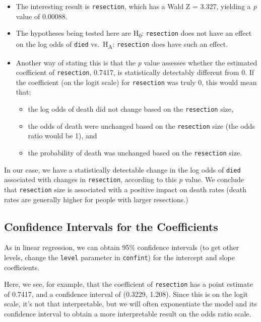 \documentclass[]{book}
\providecommand{\tightlist}{%
  \setlength{\itemsep}{0pt}\setlength{\parskip}{0pt}}
\theoremstyle{definition}
\theoremstyle{definition}
\theoremstyle{definition}
\theoremstyle{remark}
\begin{document}
\begin{itemize}
\tightlist
\item
  The interesting result is \texttt{resection}, which has a Wald Z =
  3.327, yielding a \emph{p} value of 0.00088.
\item
  The hypotheses being tested here are H\textsubscript{0}:
  \texttt{resection} does not have an effect on the log odds of
  \texttt{died} vs.~H\textsubscript{A}: \texttt{resection} does have
  such an effect.
\item
  Another way of stating this is that the \emph{p} value assesses
  whether the estimated coefficient of \texttt{resection}, 0.7417, is
  statistically detectably different from 0. If the coefficient (on the
  logit scale) for \texttt{resection} was truly 0, this would mean that:

  \begin{itemize}
  \tightlist
  \item
    the log odds of death did not change based on the \texttt{resection}
    size,
  \item
    the odds of death were unchanged based on the \texttt{resection}
    size (the odds ratio would be 1), and
  \item
    the probability of death was unchanged based on the
    \texttt{resection} size.
  \end{itemize}
\end{itemize}

In our case, we have a statistically detectable change in the log odds
of \texttt{died} associated with changes in \texttt{resection},
according to this \emph{p} value. We conclude that \texttt{resection}
size is associated with a positive impact on death rates (death rates
are generally higher for people with larger resections.)

\subsection{Confidence Intervals for the
Coefficients}\label{confidence-intervals-for-the-coefficients}

As in linear regression, we can obtain 95\% confidence intervals (to get
other levels, change the \texttt{level} parameter in \texttt{confint})
for the intercept and slope coefficients.

Here, we see, for example, that the coefficient of \texttt{resection}
has a point estimate of 0.7417, and a confidence interval of (0.3229,
1.208). Since this is on the logit scale, it's not that interpretable,
but we will often exponentiate the model and its confidence interval to
obtain a more interpretable result on the odds ratio scale.
\end{document}
